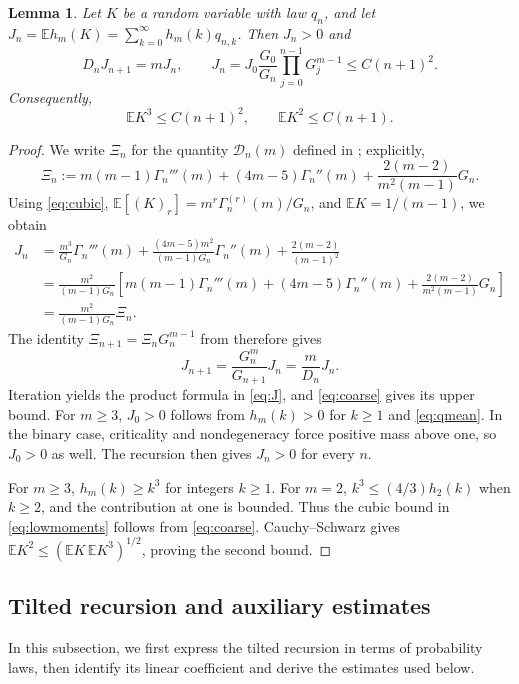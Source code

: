 \documentclass[11pt,letterpaper,reqno]{amsart}
\numberwithin{equation}{section}
\theoremstyle{plain}
\newtheorem{lemma}[theorem]{Lemma}
\theoremstyle{remark}
\newcommand{\E}{\mathbb E}\newcommand{\Pp}{\mathbb P}
\begin{document}
\begin{lemma}\label{lem:cubic}
Let $K$ be a random variable with law $q_n$, and let $J_n=\E h_m(K) = \sum^{\infty}_{k = 0} h_m(k) q_{n, k}$. Then $J_n>0$ and
\begin{equation}\label{eq:J}
 D_nJ_{n+1}=mJ_n,\qquad
 J_n=J_0\frac{G_0}{G_n}\prod_{j=0}^{n-1}G_j^{m-1}\le C(n+1)^2.
\end{equation}
Consequently,
\begin{equation}\label{eq:lowmoments}
 \E K^3\le C(n+1)^2,\qquad
 \E K^2\le C(n+1).
\end{equation}
\end{lemma}
\begin{proof}
We write $\Xi_n$ for the quantity $\mathcal D_n(m)$ defined in \cite[eq.~(18)]{CDHLS}; explicitly,
\[
 \Xi_n:=m(m-1)\Gamma_n'''(m)
 +(4m-5)\Gamma_n''(m)
 +\frac{2(m-2)}{m^2(m-1)}G_n.
\]
Using \eqref{eq:cubic}, $\E[(K)_r]=m^r\Gamma_n^{(r)}(m)/G_n$, and $\E K=1/(m-1)$, we obtain
\[
\begin{aligned}
 J_n
 &=\frac{m^3}{G_n}\Gamma_n'''(m)
   +\frac{(4m-5)m^2}{(m-1)G_n}\Gamma_n''(m)
   +\frac{2(m-2)}{(m-1)^2}\\
 &=\frac{m^2}{(m-1)G_n}
   \left[
   m(m-1)\Gamma_n'''(m)
   +(4m-5)\Gamma_n''(m)
   +\frac{2(m-2)}{m^2(m-1)}G_n
   \right]\\
 &=\frac{m^2}{(m-1)G_n}\Xi_n.
\end{aligned}
\]
The identity $\Xi_{n+1}=\Xi_nG_n^{m-1}$ from \cite[eq.~(19)]{CDHLS} therefore gives
\[
 J_{n+1}=\frac{G_n^m}{G_{n+1}}J_n=\frac{m}{D_n}J_n.
\]
Iteration yields the product formula in \eqref{eq:J}, and \eqref{eq:coarse} gives its upper bound. For $m\ge3$, $J_0>0$ follows from $h_m(k)>0$ for $k\ge1$ and \eqref{eq:qmean}. In the binary case, criticality and nondegeneracy force positive mass above one, so $J_0>0$ as well. The recursion then gives $J_n>0$ for every $n$.

For $m\ge3$, $h_m(k)\ge k^3$ for integers $k\ge1$. For $m=2$, $k^3\le(4/3)h_2(k)$ when $k\ge2$, and the contribution at one is bounded. Thus the cubic bound in \eqref{eq:lowmoments} follows from \eqref{eq:coarse}. Cauchy--Schwarz gives $\E K^2\le(\E K\,\E K^3)^{1/2}$, proving the second bound.
\end{proof}

\subsection{Tilted recursion and auxiliary estimates}\label{subsec:transport}
In this subsection, we first express the tilted recursion in terms of probability laws, then identify
its linear coefficient and derive the estimates used below.
\end{document}
